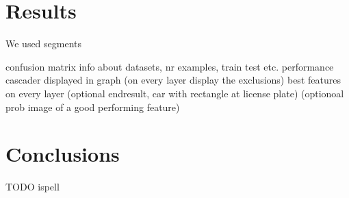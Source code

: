 \documentclass[a4paper,11pt]{article}
\begin{document}
\section*{Results}
We used segments

confusion matrix
info about datasets, nr examples, train test etc.
performance cascader displayed in graph (on every layer display the exclusions)
best features on every layer
(optional endresult, car with rectangle at license plate)
(optionoal prob image of a good performing feature)


\section*{Conclusions}
TODO ispell

\renewcommand\bibname{References}


\end{document}
